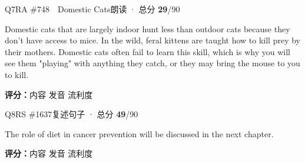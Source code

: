 \begin{qblock}{Q7\quad RA \#748\ \ Domestic Cats}{朗读 · 总分 \textcolor{cAccent}{\bfseries 29}/90}
\begin{promptbox}
Domestic cats that are largely indoor hunt less than outdoor cats because they don't have access to mice. In the wild, feral kittens are taught how to kill prey by their mothers. Domestic cats often fail to learn this skill, which is why you will see them "playing" with anything they catch, or they may bring the mouse to you to kill.
\end{promptbox}
\asrlegend
\begin{asrbox}
   \pse {}                    \pse {}                   \pse {}         \pse {}   \pse \pse {}          
\end{asrbox}
\smallskip
{\small\textbf{评分：}内容  \quad\textperiodcentered\quad 发音  \quad\textperiodcentered\quad 流利度 }
\end{qblock}

\begin{qblock}{Q8\quad RS \#1637}{复述句子 · 总分 \textcolor{cAccent}{\bfseries 49}/90}
\begin{promptbox}
The role of diet in cancer prevention will be discussed in the next chapter.
\end{promptbox}
\asrlegend
\begin{asrbox}
             
\end{asrbox}
\smallskip
{\small\textbf{评分：}内容  \quad\textperiodcentered\quad 发音  \quad\textperiodcentered\quad 流利度 }
\end{qblock}

